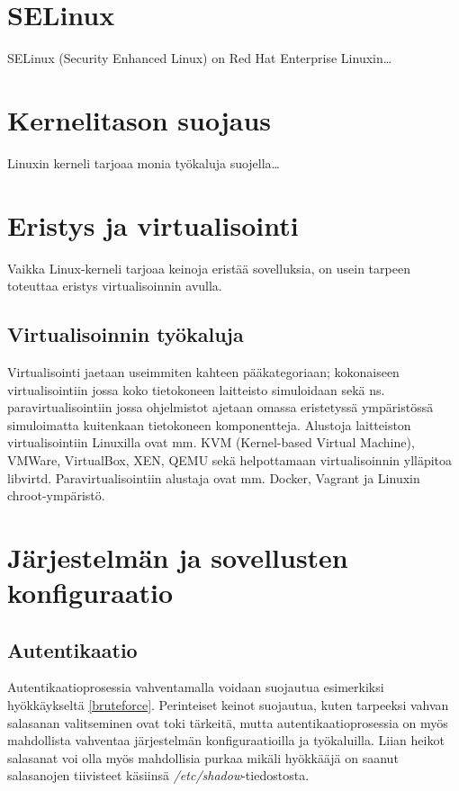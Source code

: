 \section{SELinux}\label{selinux}
SELinux (Security Enhanced Linux) on Red Hat Enterprise Linuxin\ldots

\section{Kernelitason suojaus}\label{kernelitason_suojaus}
Linuxin kerneli tarjoaa monia työkaluja suojella\ldots 

\section{Eristys ja virtualisointi}\label{eristys_ja_virtualisointi}
Vaikka Linux-kerneli tarjoaa keinoja eristää sovelluksia, on usein tarpeen toteuttaa eristys virtualisoinnin avulla.

\subsection{Virtualisoinnin työkaluja}\label{virtualisoinnin_tyokaluja}
Virtualisointi jaetaan useimmiten kahteen pääkategoriaan; kokonaiseen virtualisointiin jossa koko tietokoneen laitteisto simuloidaan sekä ns. paravirtualisointiin jossa ohjelmistot ajetaan omassa eristetyssä ympäristössä simuloimatta kuitenkaan tietokoneen komponentteja.
Alustoja laitteiston virtualisointiin Linuxilla ovat mm. KVM (Kernel-based Virtual Machine), VMWare, VirtualBox, XEN, QEMU sekä helpottamaan virtualisoinnin ylläpitoa libvirtd.
Paravirtualisointiin alustaja ovat mm. Docker, Vagrant ja Linuxin chroot-ympäristö.

\section{Järjestelmän ja sovellusten konfiguraatio}\label{sovellusten_konfiguraatio}

\subsection{Autentikaatio}\label{autentikaatio}
Autentikaatioprosessia vahventamalla voidaan suojautua esimerkiksi hyökkäykseltä \ref{bruteforce}. Perinteiset keinot suojautua, kuten tarpeeksi vahvan salasanan valitseminen ovat toki tärkeitä, mutta autentikaatioprosessia on myös mahdollista vahventaa järjestelmän konfiguraatioilla ja työkaluilla. Liian heikot salasanat voi olla myös mahdollisia purkaa mikäli hyökkääjä on saanut salasanojen tiivisteet käsiinsä \textit{/etc/shadow}-tiedostosta.

